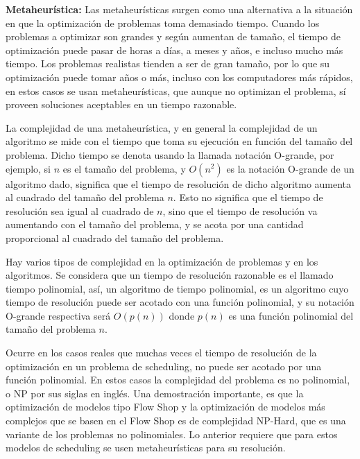 \documentclass{article}
\begin{document}
\vspace{\baselineskip}
\textbf{Metaheurística:} Las metaheurísticas surgen como una alternativa a la \linebreak situación en que la optimización de problemas toma demasiado tiempo. Cuando los problemas a optimizar son grandes y según aumentan de tamaño, el tiempo de optimización puede pasar de horas a días, a meses y años, e incluso mucho más tiempo. Los problemas realistas tienden a ser de gran tamaño, por lo que su optimización puede tomar años o más, incluso con los computadores más rápidos, en estos casos se usan metaheurísticas, que aunque no optimizan el problema, sí proveen soluciones aceptables en un tiempo razonable. \autocite{metaTalbi}

\vspace{\baselineskip}
La complejidad de una metaheurística, y en general la complejidad de un algoritmo se mide con el tiempo que toma su ejecución en función del tamaño del problema. Dicho tiempo se denota usando la llamada notación O-grande, por ejemplo, si $n$ es el tamaño del problema, y $O(n^2)$ es la notación O-grande de un algoritmo dado, significa que el tiempo de resolución de dicho algoritmo aumenta al cuadrado del tamaño del problema $n$. Esto no significa que el tiempo de resolución sea igual al cuadrado de $n$, sino que el tiempo de resolución va aumentando con el tamaño del problema, y se acota por una cantidad proporcional al cuadrado del tamaño del problema. \autocite{metaTalbi}

\vspace{\baselineskip}
Hay varios tipos de complejidad en la optimización de problemas y en los algoritmos. Se considera que un tiempo de resolución razonable es el llamado tiempo polinomial, así, un algoritmo de tiempo polinomial, es un algoritmo cuyo tiempo de resolución puede ser acotado con una función polinomial, y su notación O-grande respectiva será $O(p(n))$ donde $p(n)$ es una función polinomial del tamaño del problema $n$. \autocite{metaTalbi}

\vspace{\baselineskip}
Ocurre en los casos reales que muchas veces el tiempo de resolución de la optimización en un problema de scheduling, no puede ser acotado por una función polinomial. En estos casos la complejidad del problema es no polinomial, o NP por sus siglas en inglés. Una demostración importante, es que la optimización de modelos tipo Flow Shop y la optimización de modelos más complejos que se basen en el Flow Shop es de complejidad NP-Hard, que es una variante de los problemas no polinomiales. Lo anterior requiere que para estos modelos de scheduling se usen metaheurísticas para su resolución. \autocite{flowCompl}
\end{document}
